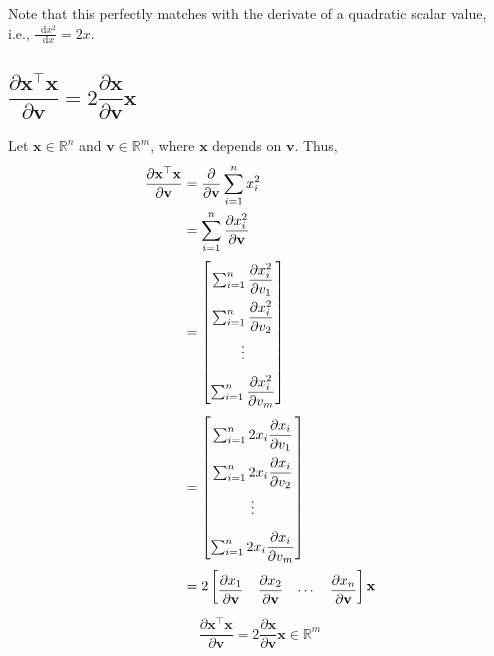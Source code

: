 \documentclass{article}
\newcommand{\trans}{\top}
\newcommand*\diff{\mathop{}\!\mathrm{d}}
\begin{document}
Note that this perfectly matches with the derivate of a quadratic scalar value, i.e., \(\frac{\diff x^2}{\diff x} = 2x\).

\subsection{\(\dfrac{\partial \mathbf{x}^\trans \mathbf{x}}{\partial \mathbf{v}} = 2\dfrac{\partial \mathbf{x}}{\partial \mathbf{v}}\mathbf{x}\)}
Let \(\mathbf{x} \in \mathbb{R}^{n}\) and \(\mathbf{v}\in \mathbb{R}^m\), where \(\mathbf{x}\) depends on \(\mathbf{v}\). Thus,
\begin{align}
    \dfrac{\partial \mathbf{x}^\trans \mathbf{x}}{\partial \mathbf{v}} & = \dfrac{\partial}{\partial \mathbf{v}}\sum_{i=1}^{n} x_i^2 \\
    & = \sum_{i=1}^{n} \dfrac{\partial x_i^2}{\partial \mathbf{v}} \\
    & = \renewcommand{\arraystretch}{2.2}\begin{bmatrix}
        \sum_{i=1}^{n} \dfrac{\partial x_i^2}{\partial v_1} \\
        \sum_{i=1}^{n} \dfrac{\partial x_i^2}{\partial v_2} \\
        \vdots \\
        \sum_{i=1}^{n} \dfrac{\partial x_i^2}{\partial v_m} \\
    \end{bmatrix} \\
    & = \renewcommand{\arraystretch}{2.2}\begin{bmatrix}
        \sum_{i=1}^{n} 2x_i\dfrac{\partial x_i}{\partial v_1} \\
        \sum_{i=1}^{n} 2x_i\dfrac{\partial x_i}{\partial v_2} \\
        \vdots \\
        \sum_{i=1}^{n} 2x_i\dfrac{\partial x_i}{\partial v_m} \\
    \end{bmatrix} \\
    & = 2 \renewcommand{\arraystretch}{2.2}\begin{bmatrix}
        \dfrac{\partial x_1}{\partial \mathbf{v}} & \dfrac{\partial x_2}{\partial \mathbf{v}} & \cdots & \dfrac{\partial x_n}{\partial \mathbf{v}}
    \end{bmatrix} \mathbf{x}
\end{align}
\begin{align}
    \boxed{\dfrac{\partial \mathbf{x}^\trans \mathbf{x}}{\partial \mathbf{v}} = 2\dfrac{\partial \mathbf{x}}{\partial \mathbf{v}}\mathbf{x} \in \mathbb{R}^m}
\end{align}
\end{document}
